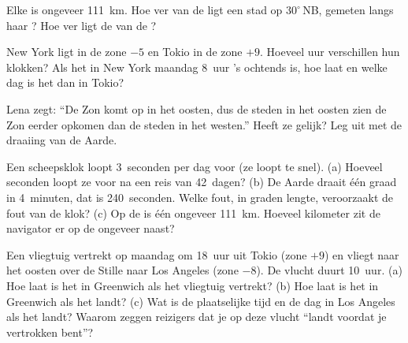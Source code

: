 \begin{exercise}[$\star\star$]\label{exo:g6:latitude-longitude:8}
Elke  is ongeveer \qty{111}{km}. Hoe ver van de  ligt
een stad op $30^\circ$\,NB, gemeten langs haar ? Hoe ver ligt de
 van de ?
\end{exercise}

\begin{exercise}[$\star\star$]\label{exo:g6:latitude-longitude:9}
New York ligt in de zone $-5$ en Tokio in de zone $+9$. Hoeveel uur
verschillen hun klokken? Als het in New York maandag 8~uur 's ochtends is,
hoe laat en welke dag is het dan in Tokio?
\end{exercise}

\begin{exercise}[$\star\star$]\label{exo:g6:latitude-longitude:10}
Lena zegt: ``De Zon komt op in het oosten, dus de steden in het oosten zien
de Zon eerder opkomen dan de steden in het westen.'' Heeft ze gelijk? Leg
uit met de draaiing van de Aarde.
\end{exercise}

\begin{exercise}[$\star\star\star$]\label{exo:g6:latitude-longitude:11}
Een scheepsklok loopt 3~seconden per dag voor (ze loopt te snel).
(a) Hoeveel seconden loopt ze voor na een reis van 42~dagen? (b) De Aarde
draait één graad in 4~minuten, dat is 240~seconden. Welke fout, in graden
lengte, veroorzaakt de fout van de klok? (c) Op de  is één
 ongeveer \qty{111}{km}. Hoeveel kilometer zit de navigator er
op de  ongeveer naast?
\end{exercise}

\begin{exercise}[$\star\star\star$]\label{exo:g6:latitude-longitude:12}
Een vliegtuig vertrekt op maandag om 18~uur uit Tokio (zone $+9$) en
vliegt naar het oosten over de Stille  naar Los Angeles (zone $-8$).
De vlucht duurt 10~uur. (a) Hoe laat is het in Greenwich als het vliegtuig
vertrekt? (b) Hoe laat is het in Greenwich als het landt? (c) Wat is de
plaatselijke tijd en de dag in Los Angeles als het landt? Waarom zeggen
reizigers dat je op deze vlucht ``landt voordat je vertrokken bent''?
\end{exercise}

